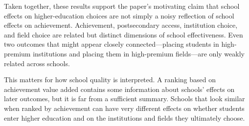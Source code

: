 \documentclass[a4paper, article, english, oneside, unknownkeysallowed, 12pt]{memoir}
\begin{document}
Taken together, these results support the paper's motivating claim that school effects on higher-education choices are not simply a noisy reflection of school effects on achievement.
Achievement, postsecondary access, institution choice, and field choice are related but distinct dimensions of school effectiveness. 
Even two outcomes that might appear closely connected---placing students in high-premium institutions and placing them in high-premium fields---are only weakly related across schools.

This matters for how school quality is interpreted. 
A ranking based on achievement value added contains some information about schools' effects on later outcomes, but it is far from a sufficient summary. 
Schools that look similar when ranked by achievement can have very different effects on whether students enter higher education and on the institutions and fields they ultimately choose.
\end{document}
